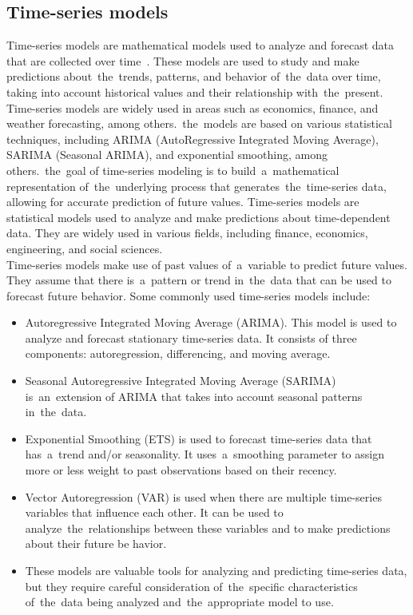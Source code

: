 \subsection{Time-series models}\label{sec:timeseries}
Time-series models are mathematical models used to analyze and forecast data that are collected over time~\cite{Cryer}.
These models are used to study and make predictions about~the~trends, patterns, and behavior of~the~data over time,
taking into account historical values and their relationship with~the~present. Time-series models are widely
used in areas such as economics, finance, and weather forecasting, among others.~the~models are based on various
statistical techniques, including ARIMA (AutoRegressive Integrated Moving Average), SARIMA (Seasonal ARIMA),
and exponential smoothing, among others.~the~goal of time-series modeling is to build~a~mathematical representation
of~the~underlying process that generates~the~time-series data, allowing for accurate prediction of future values.
Time-series models are statistical models used to analyze and make predictions about time-dependent data. They are
widely used in various fields, including finance, economics, engineering, and social sciences.
\\
Time-series models make use of past values of~a~variable to predict future values.
They assume that there is~a~pattern or trend in~the~data that can be used to forecast future behavior.
Some commonly used time-series models include:
\begin{itemize}
    \item Autoregressive Integrated Moving Average (ARIMA). This model is used to analyze and forecast stationary
    time-series data. It consists of three components: autoregression, differencing, and moving average.
    \item Seasonal Autoregressive Integrated Moving Average (SARIMA) is~an~extension of ARIMA
    that takes into account seasonal patterns in~the~data.
    \item Exponential Smoothing (ETS) is used to forecast time-series data that has~a~trend
    and/or seasonality. It uses~a~smoothing parameter to assign more or less weight to past observations
    based on their recency.
    \item Vector Autoregression (VAR) is used when there are multiple time-series variables
    that influence each other. It can be used to analyze~the~relationships between these variables and to make
    predictions about their future be   havior.
    \item These models are valuable tools for analyzing and predicting time-series data, but they require careful
    consideration of~the~specific characteristics of~the~data being analyzed and~the~appropriate model to use.
\end{itemize}

